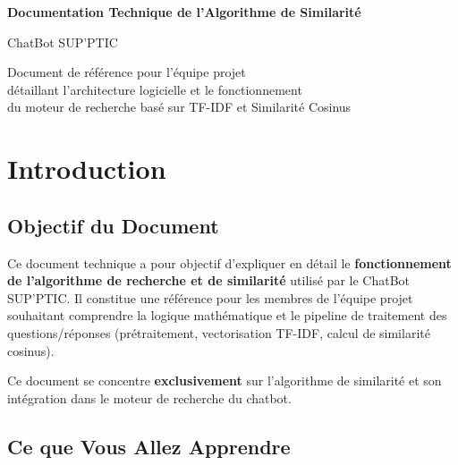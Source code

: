 \documentclass[11pt,a4paper]{article}
\begin{document}
\begin{titlepage}
    \centering
    \vspace*{2cm}
    {\Huge \textbf{Documentation Technique de l'Algorithme de Similarité}} 
    
\vspace{0.5cm}
    {\Large ChatBot SUP'PTIC} 

\vspace{1.5cm}
    
    \begin{minipage}{0.8\textwidth}
        \centering
        \small Document de référence pour l'équipe projet \\
        détaillant l'architecture logicielle et le fonctionnement \\
        du moteur de recherche basé sur TF-IDF et Similarité Cosinus
    \end{minipage}
    
\end{titlepage}


\tableofcontents
\clearpage

\section{Introduction}
\label{sec:introduction}

\subsection{Objectif du Document}

Ce document technique a pour objectif d’expliquer en détail le 
\textbf{fonctionnement de l’algorithme de recherche et de similarité} 
utilisé par le ChatBot SUP'PTIC. 
Il constitue une référence pour les membres de l’équipe projet 
souhaitant comprendre la logique mathématique et le pipeline de traitement 
des questions/réponses (prétraitement, vectorisation TF-IDF, calcul de similarité cosinus).

\begin{important}[Périmètre]
Ce document se concentre \textbf{exclusivement} sur l’algorithme de similarité 
et son intégration dans le moteur de recherche du chatbot. 
\end{important}


\subsection{Ce que Vous Allez Apprendre}
\end{document}

